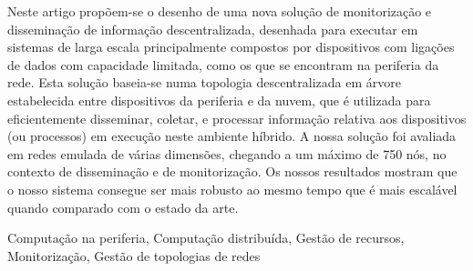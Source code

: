 Neste artigo propõem-se o desenho de uma nova solução de monitorização e disseminação de informação descentralizada, desenhada para executar em sistemas de larga escala principalmente compostos por dispositivos com ligações de dados com capacidade limitada, como os que se encontram na periferia da rede. Esta solução baseia-se numa topologia descentralizada em árvore estabelecida entre dispositivos da periferia e da nuvem, que é utilizada para eficientemente disseminar, coletar, e processar informação relativa aos dispositivos (ou processos) em execução neste ambiente híbrido. A nossa solução foi avaliada em redes emulada de várias dimensões, chegando a um máximo de 750 nós, no contexto de disseminação e de monitorização. Os nossos resultados mostram que o nosso sistema consegue ser mais robusto ao mesmo tempo que é mais escalável quando comparado com o estado da arte.






\begin{keywords}

    
    Computação na periferia, Computação distribuída, Gestão de recursos, Monitorização, Gestão de topologias de redes

\end{keywords}
